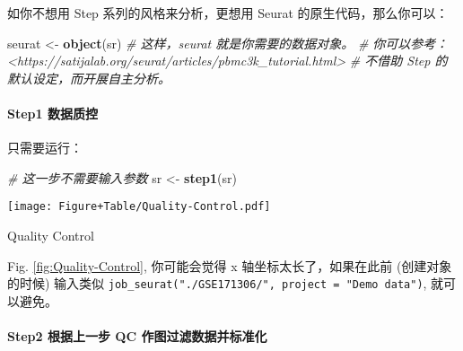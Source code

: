\documentclass[
]{article}
\newenvironment{Shaded}{\begin{snugshade}}{\end{snugshade}}
\newcommand{\CommentTok}[1]{\textcolor[rgb]{0.56,0.35,0.01}{\textit{#1}}}
\newcommand{\KeywordTok}[1]{\textcolor[rgb]{0.13,0.29,0.53}{\textbf{#1}}}
\newcommand{\NormalTok}[1]{#1}
\newcommand{\OperatorTok}[1]{\textcolor[rgb]{0.81,0.36,0.00}{\textbf{#1}}}
\newcommand{\StringTok}[1]{\textcolor[rgb]{0.31,0.60,0.02}{#1}}
\begin{document}
如你不想用 Step 系列的风格来分析，更想用 Seurat 的原生代码，那么你可以：

\begin{Shaded}
\begin{Highlighting}[]
\NormalTok{seurat \textless{}{-}}\StringTok{ }\KeywordTok{object}\NormalTok{(sr)}
\CommentTok{\# 这样，\textasciigrave{}seurat\textasciigrave{} 就是你需要的数据对象。}
\CommentTok{\# 你可以参考：\textless{}https://satijalab.org/seurat/articles/pbmc3k\_tutorial.html\textgreater{}}
\CommentTok{\# 不借助 Step 的默认设定，而开展自主分析。}
\end{Highlighting}
\end{Shaded}

\hypertarget{step1-ux6570ux636eux8d28ux63a7}{%
\paragraph{Step1 数据质控}\label{step1-ux6570ux636eux8d28ux63a7}}

只需要运行：

\begin{Shaded}
\begin{Highlighting}[]
\CommentTok{\# 这一步不需要输入参数}
\NormalTok{sr \textless{}{-}}\StringTok{ }\KeywordTok{step1}\NormalTok{(sr)}
\end{Highlighting}
\end{Shaded}

\begin{Shaded}
\end{Shaded}

\def\@captype{figure}
\begin{center}
\texttt{[image: Figure+Table/Quality-Control.pdf]}
\caption{Quality Control}\label{fig:Quality-Control}
\end{center}

Fig. \ref{fig:Quality-Control}, 你可能会觉得 x 轴坐标太长了，如果在此前
(创建对象的时候) 输入类似 \texttt{job\_seurat("./GSE171306/",\ project\ =\ "Demo\ data")}, 就可以避免。

\hypertarget{step2-ux6839ux636eux4e0aux4e00ux6b65-qc-ux4f5cux56feux8fc7ux6ee4ux6570ux636eux5e76ux6807ux51c6ux5316}{%
\paragraph{Step2 根据上一步 QC 作图过滤数据并标准化}\label{step2-ux6839ux636eux4e0aux4e00ux6b65-qc-ux4f5cux56feux8fc7ux6ee4ux6570ux636eux5e76ux6807ux51c6ux5316}}
\end{document}

